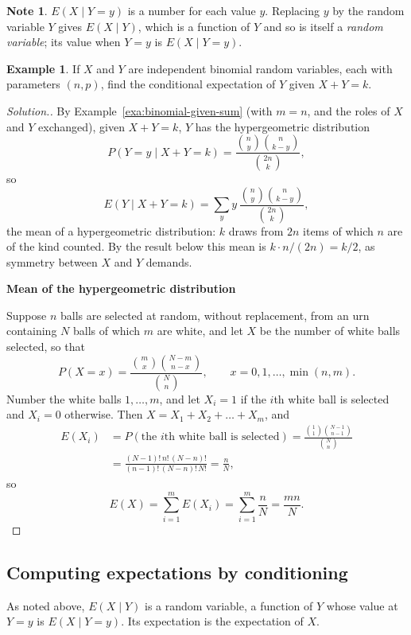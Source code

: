 \documentclass[11pt,a4paper]{article}
\theoremstyle{definition}
\newtheorem{exa}[thm]{Example}
\newtheorem*{note}{Note}
\newenvironment{solution}
  {\renewcommand{\qedsymbol}{}\begin{proof}[\textit{Solution}.]}
  {\end{proof}}
\newcommand{\subhead}[1]{%
  \par\medskip\noindent\textbf{#1}\par\nobreak\smallskip}
\begin{document}
\begin{note}
$E(X \mid Y = y)$ is a number for each value $y$. Replacing $y$ by the random variable $Y$ gives $E(X \mid Y)$, which is a function of $Y$ and so is
itself a \emph{random variable}; its value when $Y = y$ is $E(X \mid Y = y)$.
\end{note}

\begin{exa}\label{exa:binomial-cond-mean}
If $X$ and $Y$ are independent binomial random variables, each with parameters $(n, p)$, find the conditional expectation of $Y$ given
$X + Y = k$.
\end{exa}

\begin{solution}
By Example~\ref{exa:binomial-given-sum} (with $m = n$, and the roles of $X$ and $Y$ exchanged), given $X + Y = k$, $Y$ has the hypergeometric
distribution
\[
P(Y = y \mid X + Y = k) = \frac{\binom ny\binom n{k-y}}{\binom{2n}k} ,
\]
so
\[
E(Y \mid X + Y = k) = \sum_yy\,\frac{\binom ny\binom n{k-y}}{\binom{2n}k} ,
\]
the mean of a hypergeometric distribution: $k$ draws from $2n$ items of which $n$ are of the kind counted. By the result
below this mean is $k \cdot n/(2n) = k/2$, as symmetry between $X$ and $Y$ demands.

\subhead{Mean of the hypergeometric distribution}
Suppose $n$ balls are selected at random, without replacement, from an urn containing $N$ balls of which $m$ are white, and let $X$ be the
number of white balls selected, so that
\[
P(X = x) = \frac{\binom mx\binom{N-m}{n-x}}{\binom Nn} , \qquad x = 0, 1, \dots, \min(n, m) .
\]
Number the white balls $1, \dots, m$, and let $X_i = 1$ if the $i$th white ball is selected and $X_i = 0$ otherwise. Then $X = X_1 + X_2 + \dots + X_m$, and
\begin{align*}
E(X_i) &= P(\text{the } i\text{th white ball is selected}) = \frac{\binom11\binom{N-1}{n-1}}{\binom Nn} \\
&= \frac{(N - 1)!\,n!\,(N - n)!}{(n - 1)!\,(N - n)!\,N!} = \frac nN ,
\end{align*}
so
\[
E(X) = \sum_{i=1}^mE(X_i) = \sum_{i=1}^m\frac nN = \frac{mn}N .
\]
\end{solution}

\subsection{Computing expectations by conditioning}
As noted above, $E(X \mid Y)$ is a random variable, a function of $Y$ whose value at $Y = y$ is $E(X \mid Y = y)$. Its expectation is the
expectation of $X$.
\end{document}
